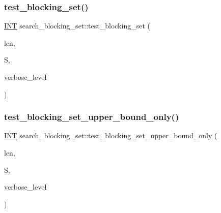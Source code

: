 \subsubsection{\texorpdfstring{test\+\_\+blocking\+\_\+set()}{test\_blocking\_set()}}
{\footnotesize\ttfamily \mbox{\hyperlink{galois_8h_a09fddde158a3a20bd2dcadb609de11dc}{I\+NT}} search\+\_\+blocking\+\_\+set\+::test\+\_\+blocking\+\_\+set (\begin{DoxyParamCaption}\item[{\mbox{\hyperlink{galois_8h_a09fddde158a3a20bd2dcadb609de11dc}{I\+NT}}}]{len,  }\item[{\mbox{\hyperlink{galois_8h_a09fddde158a3a20bd2dcadb609de11dc}{I\+NT}} $\ast$}]{S,  }\item[{\mbox{\hyperlink{galois_8h_a09fddde158a3a20bd2dcadb609de11dc}{I\+NT}}}]{verbose\+\_\+level }\end{DoxyParamCaption})}

\mbox{\label{classsearch__blocking__set_ae1ec331b4fa4715c79a22bac0a71f146}} 
\subsubsection{\texorpdfstring{test\+\_\+blocking\+\_\+set\+\_\+upper\+\_\+bound\+\_\+only()}{test\_blocking\_set\_upper\_bound\_only()}}
{\footnotesize\ttfamily \mbox{\hyperlink{galois_8h_a09fddde158a3a20bd2dcadb609de11dc}{I\+NT}} search\+\_\+blocking\+\_\+set\+::test\+\_\+blocking\+\_\+set\+\_\+upper\+\_\+bound\+\_\+only (\begin{DoxyParamCaption}\item[{\mbox{\hyperlink{galois_8h_a09fddde158a3a20bd2dcadb609de11dc}{I\+NT}}}]{len,  }\item[{\mbox{\hyperlink{galois_8h_a09fddde158a3a20bd2dcadb609de11dc}{I\+NT}} $\ast$}]{S,  }\item[{\mbox{\hyperlink{galois_8h_a09fddde158a3a20bd2dcadb609de11dc}{I\+NT}}}]{verbose\+\_\+level }\end{DoxyParamCaption})}

\mbox{\label{classsearch__blocking__set_a438d1a418dc20c5ad05b533fa881729d}} 
